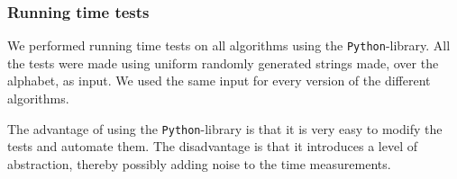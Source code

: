 \subsubsection{Running time tests}\label{sec:runningtimetests}
We performed running time tests on all algorithms using the \texttt{Python}-library. All the tests were made using uniform randomly generated strings made, over the alphabet, as input. We used the same input for every version of the different algorithms.

The advantage of using the \texttt{Python}-library is that it is very easy to modify the tests and automate them. The disadvantage is that it introduces a level of abstraction, thereby possibly adding noise to the time measurements.
